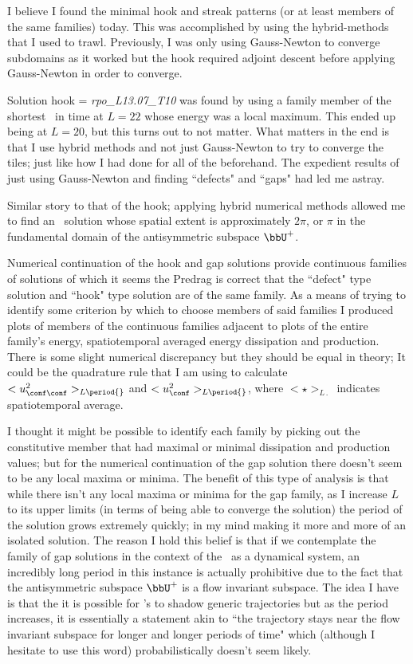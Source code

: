 \begin{itemize}
I believe I found the minimal hook and streak patterns (or at least
members of the same families) today. This was accomplished by using the
hybrid-methods that I used to trawl. Previously, I was only using
Gauss-Newton to converge subdomains as it worked but the hook required
adjoint descent before applying Gauss-Newton in order to converge.

Solution hook = \emph{rpo\_L13.07\_T10} was found by using a family
member of the shortest \ppo\ in time at $L=22$ whose energy was a local
maximum. This ended up being at $L=20$, but this turns out to not matter.
What matters in the end is that I use hybrid methods and not just
Gauss-Newton to try to converge the tiles; just like how I had done for
all of the {\twots} beforehand. The expedient results of
just using Gauss-Newton and finding ``defects" and ``gaps" had led me
astray.

Similar story to that of the hook; applying hybrid numerical methods
allowed me to find an \eqv\ solution whose spatial extent is
approximately $2\pi$, or $\pi$ in the fundamental domain of the
antisymmetric subspace $\bbU^+$.

Numerical continuation of the hook and gap solutions provide continuous
families of solutions of which it seems the Predrag is correct that the
``defect" type solution and ``hook" type solution are of the same family.
As a means of trying to identify some criterion by which to choose
members of said families I produced plots of members of the continuous
families adjacent to plots of the entire family's energy, spatiotemporal
averaged energy dissipation and production. There is some slight
numerical discrepancy but they should be equal in theory; It could be the
quadrature rule that I am using to calculate $<u_{\conf\conf}^2>_{L\period{}}$
and $<u_{\conf}^2>_{L\period{}}$, where $< \star >_{L\period{}}$ indicates
spatiotemporal average.

I thought it might be possible to identify each family by picking out the
constitutive member that had maximal or minimal dissipation and
production values; but for the numerical continuation of the gap solution
there doesn't seem to be any local maxima or minima. The benefit of this
type of analysis is that while there isn't any local maxima or minima for
the gap family, as I increase $L$ to its upper limits (in terms of being
able to converge the solution) the period of the solution grows extremely
quickly; in my mind making it more and more of an isolated solution. The
reason I hold this belief is that if we contemplate the family of gap
solutions in the context of the \KSe\ as a dynamical system, an
incredibly long period in this instance is actually prohibitive due to
the fact that the antisymmetric subspace $\bbU^+$ is a flow invariant
subspace. The idea I have is that the it is possible for \po 's to shadow
generic trajectories but as the period increases, it is essentially a
statement akin to ``the trajectory stays near the flow invariant subspace
for longer and longer periods of time" which (although I hesitate to use
this word) probabilistically doesn't seem likely.


\end{itemize}
